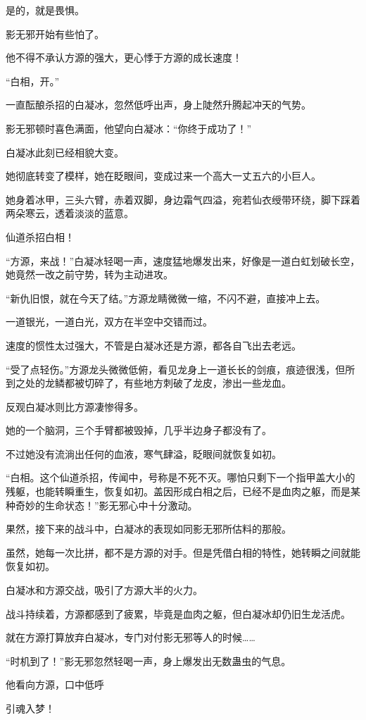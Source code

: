 \begin{this_body}
是的，就是畏惧。

影无邪开始有些怕了。

他不得不承认方源的强大，更心悸于方源的成长速度！

“白相，开。”

一直酝酿杀招的白凝冰，忽然低呼出声，身上陡然升腾起冲天的气势。

影无邪顿时喜色满面，他望向白凝冰：“你终于成功了！”

白凝冰此刻已经相貌大变。

她彻底转变了模样，她在眨眼间，变成过来一个高大一丈五六的小巨人。

她身着冰甲，三头六臂，赤着双脚，身边霜气四溢，宛若仙衣绶带环绕，脚下踩着两朵寒云，透着淡淡的蓝意。

仙道杀招白相！

“方源，来战！”白凝冰轻喝一声，速度猛地爆发出来，好像是一道白虹划破长空，她竟然一改之前守势，转为主动进攻。

“新仇旧恨，就在今天了结。”方源龙睛微微一缩，不闪不避，直接冲上去。

一道银光，一道白光，双方在半空中交错而过。

速度的惯性太过强大，不管是白凝冰还是方源，都各自飞出去老远。

“受了点轻伤。”方源龙头微微低俯，看见龙身上一道长长的剑痕，痕迹很浅，但所到之处的龙鳞都被切碎了，有些地方刺破了龙皮，渗出一些龙血。

反观白凝冰则比方源凄惨得多。

她的一个脑洞，三个手臂都被毁掉，几乎半边身子都没有了。

不过她没有流淌出任何的血液，寒气肆溢，眨眼间就恢复如初。

“白相。这个仙道杀招，传闻中，号称是不死不灭。哪怕只剩下一个指甲盖大小的残躯，也能转瞬重生，恢复如初。盖因形成白相之后，已经不是血肉之躯，而是某种奇妙的生命状态！”影无邪心中十分激动。

果然，接下来的战斗中，白凝冰的表现如同影无邪所估料的那般。

虽然，她每一次比拼，都不是方源的对手。但是凭借白相的特性，她转瞬之间就能恢复如初。

白凝冰和方源交战，吸引了方源大半的火力。

战斗持续着，方源都感到了疲累，毕竟是血肉之躯，但白凝冰却仍旧生龙活虎。

就在方源打算放弃白凝冰，专门对付影无邪等人的时候……

“时机到了！”影无邪忽然轻喝一声，身上爆发出无数蛊虫的气息。

他看向方源，口中低呼

引魂入梦！

\end{this_body}

